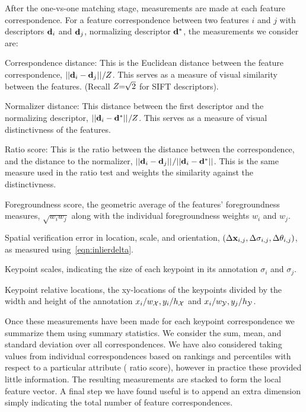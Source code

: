 After the one-vs-one matching stage, measurements are made at each feature correspondence.
For a feature correspondence between two features $i$ and $j$ with descriptors $\mathbf{d}_i$ and $\mathbf{d}_j$,
  normalizing descriptor $\mathbf{d}^{*}$, the measurements we consider are:
\begin{itemln}

    \item Correspondence distance:
    This is the Euclidean distance between the feature correspondence, $||\mathbf{d}_i - \mathbf{d}_j||_{} / Z$.
    This serves as a measure of visual similarity between the features.
    (Recall $Z\mkern-6mu=\mkern-6mu\sqrt{2}$ for SIFT descriptors).

    \item Normalizer distance:
    This distance between the first descriptor and the normalizing descriptor, %
        $||\mathbf{d}_i - \mathbf{d}^{*}||_{} / Z$.
        This serves as a measure of visual distinctivness of the features.

    \item Ratio score:
    This is the ratio between the distance between the correspondence, and the distance to the normalizer, %
        $||\mathbf{d}_i - \mathbf{d}_j||_{} / ||\mathbf{d}_i - \mathbf{d}^{*}||_{}$.
        This is the same measure used in the ratio test and weights the similarity against the distinctivness.

    \item Foregroundness score, the geometric average of the features' foregroundness measures, $\sqrt{w_i w_j}$
      along with the individual foregroundness weights $w_i$ and $w_j$.
        
    \item Spatial verification error in location, scale, and orientation, $( %
        \Delta \pt_{i, j}, %
        \Delta \scale_{i, j}, %
        \Delta \ori_{i, j})$, as measured using~\cref{eqn:inlierdelta}.

    \item Keypoint scales, indicating the size of each keypoint in its annotation $\sigma_i$ and $\sigma_j$.

    \item Keypoint relative locations, the xy-locations of the keypoints divided by the width and height of the
      annotation $x_i / w_{\mathcal{X}}, y_i / h_{\mathcal{X}}$ and $x_i / w_{\mathcal{Y}}, y_j / h_{\mathcal{Y}}$.
\end{itemln}

Once these measurements have been made for each keypoint correspondence we summarize them using summary
  statistics.
We consider the sum, mean, and standard deviation over all correspondences.
We have also considered taking values from individual correspondences based on rankings and percentiles with
  respect to a particular attribute (\eg{} ratio score), however in practice these provided little information.
The resulting measurements are stacked to form the local feature vector.
A final step we have found useful is to append an extra dimension simply indicating the total number of feature
  correspondences.

